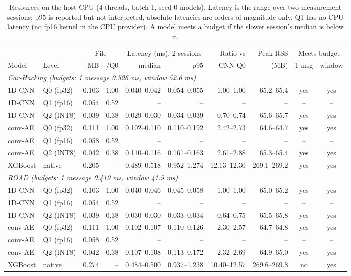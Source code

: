 \begin{table}[t]
\centering
\footnotesize
\caption{Resources on the host CPU (4 threads, batch 1, seed-0 models). Latency is the range over two measurement sessions; p95 is reported but not interpreted, absolute latencies are orders of magnitude only. Q1 has no CPU latency (no fp16 kernel in the CPU provider). A model meets a budget if the slower session's median is below it.}
\label{tab:resources}
\begin{tabular}{@{}llrrrrrrcc@{}}
\toprule
& & \multicolumn{2}{c}{File} & \multicolumn{2}{c}{Latency (ms), 2 sessions} & Ratio vs & Peak RSS & \multicolumn{2}{c}{Meets budget} \\
\cmidrule(lr){3-4}\cmidrule(lr){5-6}\cmidrule(lr){9-10}
Model & Level & MB & /Q0 & median & p95 & CNN Q0 & (MB) & 1 msg & window \\
\midrule
\multicolumn{10}{l}{\textit{Car-Hacking (budgets: 1 message 0.526 ms, window 52.6 ms)}} \\
1D-CNN & Q0 (fp32) & 0.103 & 1.00 & 0.040--0.042 & 0.054--0.055 & 1.00--1.00 & 65.2--65.4 & yes & yes \\
1D-CNN & Q1 (fp16) & 0.054 & 0.52 & -- & -- & -- & -- & -- & -- \\
1D-CNN & Q2 (INT8) & 0.039 & 0.38 & 0.029--0.030 & 0.034--0.039 & 0.70--0.74 & 65.6--65.7 & yes & yes \\
conv-AE & Q0 (fp32) & 0.111 & 1.00 & 0.102--0.110 & 0.110--0.192 & 2.42--2.73 & 64.6--64.7 & yes & yes \\
conv-AE & Q1 (fp16) & 0.058 & 0.52 & -- & -- & -- & -- & -- & -- \\
conv-AE & Q2 (INT8) & 0.042 & 0.38 & 0.110--0.116 & 0.161--0.163 & 2.61--2.88 & 65.3--65.4 & yes & yes \\
XGBoost & native & 0.205 & -- & 0.489--0.518 & 0.952--1.274 & 12.13--12.30 & 269.1--269.2 & yes & yes \\
\midrule
\multicolumn{10}{l}{\textit{ROAD (budgets: 1 message 0.419 ms, window 41.9 ms)}} \\
1D-CNN & Q0 (fp32) & 0.103 & 1.00 & 0.040--0.046 & 0.045--0.058 & 1.00--1.00 & 65.0--65.2 & yes & yes \\
1D-CNN & Q1 (fp16) & 0.054 & 0.52 & -- & -- & -- & -- & -- & -- \\
1D-CNN & Q2 (INT8) & 0.039 & 0.38 & 0.030--0.030 & 0.033--0.034 & 0.64--0.75 & 65.5--65.8 & yes & yes \\
conv-AE & Q0 (fp32) & 0.111 & 1.00 & 0.102--0.107 & 0.110--0.126 & 2.30--2.57 & 64.7--64.8 & yes & yes \\
conv-AE & Q1 (fp16) & 0.058 & 0.52 & -- & -- & -- & -- & -- & -- \\
conv-AE & Q2 (INT8) & 0.042 & 0.38 & 0.107--0.108 & 0.113--0.172 & 2.32--2.69 & 64.9--65.0 & yes & yes \\
XGBoost & native & 0.274 & -- & 0.484--0.500 & 0.937--1.238 & 10.40--12.57 & 269.6--269.8 & no & yes \\
\bottomrule
\end{tabular}
\end{table}
